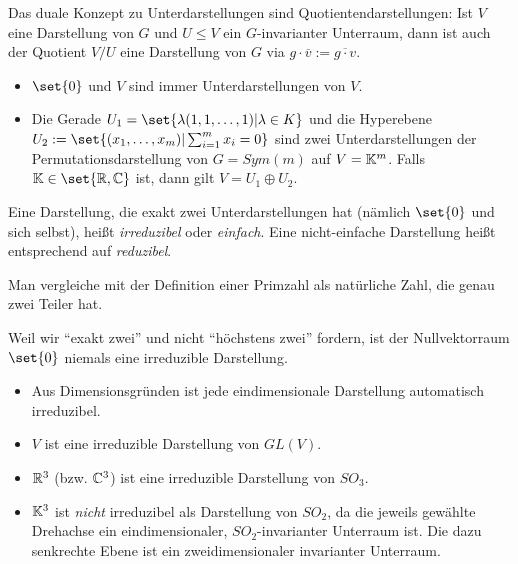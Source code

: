 \begin{lemma}[Quotienten]
Das duale Konzept zu Unterdarstellungen sind Quotientendarstellungen: Ist $V$ eine Darstellung von $G$ und $U\leq V$ ein $G$-invarianter Unterraum, dann ist auch der Quotient $V/U$ eine Darstellung von $G$ via $g\cdot\overline{v} := \overline{g\cdot v}$.
\end{lemma}

\begin{example}
\begin{itemize}
\item $\set{0}$ und $V$ sind immer Unterdarstellungen von $V$.
\item Die Gerade $U_1=\set{\lambda(1,1,\ldots,1) | \lambda\in K}$ und die Hyperebene $U_2 := \set{(x_1,\ldots,x_m) | \sum_{i=1}^m x_i = 0}$ sind zwei Unterdarstellungen der Permutationsdarstellung von $G=Sym(m)$ auf $V=\mathbb{K}^m$. Falls $\IK\in\set{\IR,\IC}$ ist, dann gilt $V=U_1\oplus U_2$.
\end{itemize}
\end{example}

\begin{definition}
Eine Darstellung, die exakt zwei Unterdarstellungen hat (nämlich $\set{0}$ und sich selbst), heißt \emph{irreduzibel} oder \emph{einfach}. Eine nicht-einfache Darstellung heißt entsprechend auf \emph{reduzibel}.
\end{definition}

\begin{remark}
Man vergleiche mit der Definition einer Primzahl als natürliche Zahl, die genau zwei Teiler hat.
\end{remark}

\begin{remark}
Weil wir \enquote{exakt zwei} und nicht \enquote{höchstens zwei} fordern, ist der Nullvektorraum $\set{0}$ niemals eine irreduzible Darstellung.
\end{remark}

\begin{example}
\begin{itemize}
\item Aus Dimensionsgründen ist jede eindimensionale Darstellung automatisch irreduzibel.
\item $V$ ist eine irreduzible Darstellung von $GL(V)$.
\item $\mathbb{R}^3$ (bzw. $\mathbb{C}^3$) ist eine irreduzible Darstellung von $SO_3$.
\item $\mathbb{K}^3$ ist \emph{nicht} irreduzibel als Darstellung von $SO_2$, da die jeweils gewählte Drehachse ein eindimensionaler, $SO_2$-invarianter Unterraum ist. Die dazu senkrechte Ebene ist ein zweidimensionaler invarianter Unterraum.
\end{itemize}
\end{example}

